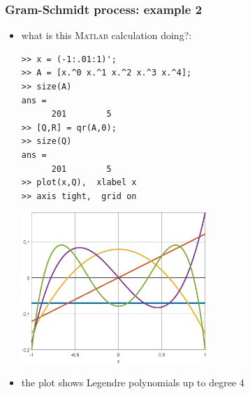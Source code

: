 \documentclass[10pt,hyperref]{beamer}
\newcommand{\Matlab}{\textsc{Matlab}\xspace}
\begin{document}
\begin{frame}[fragile]
\frametitle{Gram-Schmidt process: example 2}

\begin{itemize}
\item what is this \Matlab calculation doing?:

\medskip
\begin{Verbatim}[fontsize=\scriptsize]
>> x = (-1:.01:1)';
>> A = [x.^0 x.^1 x.^2 x.^3 x.^4];
>> size(A)
ans =
      201        5
>> [Q,R] = qr(A,0);
>> size(Q)
ans =
      201        5
>> plot(x,Q),  xlabel x
>> axis tight,  grid on
\end{Verbatim}

\vspace{-18mm}
\hfill \includegraphics[width=0.55\textwidth]{figs/legendre} \quad 

\item the plot shows Legendre polynomials up to degree 4
\end{itemize}
\end{frame}
\end{document}

